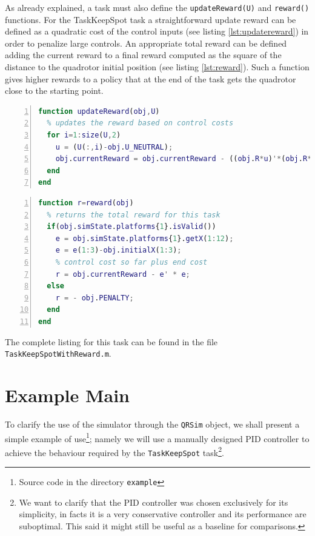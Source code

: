 \documentclass[a4paper,11pt]{report}
\newcommand{\snamettt}{\texttt{QRSim}\xspace}
\begin{document}
As already explained, a task must also define the \texttt{updateReward(U)} and \texttt{reward()} functions. For the TaskKeepSpot task a straightforward update reward can be defined as a quadratic cost of the control inputs (see listing \ref{lst:updatereward}) in order to penalize large controls. An appropriate total reward can be defined adding the current reward to a final reward computed as the square of the distance to the quadrotor initial position (see listing \ref{lst:reward}). Such a function gives higher rewards to a policy that at the end of the task gets the quadrotor close to the starting point.

\begin{lstlisting}[float=ht!bp,caption=TaskKeepSpotWithReward updateReward(U) method,language=Matlab,frame=lines,label=lst:updatereward,numbers=left,basicstyle=\small]
function updateReward(obj,U)         
  % updates the reward based on control costs
  for i=1:size(U,2)
    u = (U(:,i)-obj.U_NEUTRAL);
    obj.currentReward = obj.currentReward - ((obj.R*u)'*(obj.R*u))*obj.dt;
  end
end
\end{lstlisting}    
\begin{lstlisting}[float=ht!bp,caption=TaskKeepSpot reward() method,language=Matlab,frame=lines,label=lst:reward,numbers=left,basicstyle=\small]   
function r=reward(obj) 
  % returns the total reward for this task      
  if(obj.simState.platforms{1}.isValid())
    e = obj.simState.platforms{1}.getX(1:12);
    e = e(1:3)-obj.initialX(1:3);
    % control cost so far plus end cost
    r = obj.currentReward - e' * e; 
  else
    r = - obj.PENALTY;
  end                
end
\end{lstlisting}

The complete listing for this task can be found in the file \texttt{TaskKeepSpotWithReward.m}.  

\section{Example Main}
To clarify the use of the simulator through the \snamettt object, we shall present a simple example of use\footnote{Source code in the directory \texttt{example}}; namely we will use a manually designed PID controller to achieve the behaviour required by the \texttt{TaskKeepSpot} task\footnote{We want to clarify that the PID controller was chosen exclusively for its simplicity, in facts it is a very conservative controller and its performance are suboptimal. This said it might still be useful as a baseline for comparisons.}.
\end{document}
